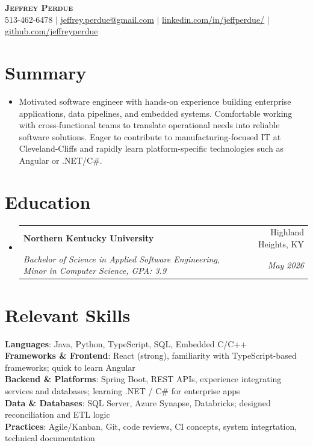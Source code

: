 \documentclass[letterpaper,11pt]{article}
\makeatletter
\newcommand{\resumeItem}[1]{
  \item\small{{#1 \vspace{-2pt}}}
}
\newcommand{\resumeSubheading}[4]{
  \vspace{-2pt}\item
    \begin{tabular*}{0.97\textwidth}[t]{l@{\extracolsep{\fill}}r}
      \textbf{#1} & #2 \\
      \textit{\small#3} & \textit{\small #4} \\
    \end{tabular*}\vspace{-7pt}
}
\newcommand{\resumeSubHeadingListStart}{\begin{itemize}[leftmargin=0.15in, label={}]}
\newcommand{\resumeSubHeadingListEnd}{\end{itemize}}
\newcommand{\resumeItemListStart}{\begin{itemize}}
\newcommand{\resumeItemListEnd}{\end{itemize}\vspace{-5pt}}
\makeatother
\begin{document}
\begin{center}
    \textbf{\Huge \scshape Jeffrey Perdue} \\ \vspace{1pt}
    \small 513-462-6478 $|$ \href{mailto:jeffrey.perdue@gmail.com}{\underline{jeffrey.perdue@gmail.com}} $|$
    \href{https://linkedin.com/in/jeffperdue/}{\underline{linkedin.com/in/jeffperdue/}} $|$
    \href{https://github.com/jeffreyperdue}{\underline{github.com/jeffreyperdue}}
\end{center}

\section{Summary}
\resumeSubHeadingListStart
\resumeItemListStart
\resumeItem{Motivated software engineer with hands-on experience building enterprise applications, data pipelines, and embedded systems. Comfortable working with cross-functional teams to translate operational needs into reliable software solutions. Eager to contribute to manufacturing-focused IT at Cleveland-Cliffs and rapidly learn platform-specific technologies such as Angular or .NET/C#.}
\resumeItemListEnd
\resumeSubHeadingListEnd

\section{Education}
\resumeSubHeadingListStart
\resumeSubheading
{Northern Kentucky University}{Highland Heights, KY}
{Bachelor of Science in Applied Software Engineering, Minor in Computer Science, GPA: 3.9}{May 2026}
\resumeSubHeadingListEnd

\section{Relevant Skills}
\begin{itemize}[leftmargin=0.15in, label={}]
\small{\item{
\textbf{Languages}: Java, Python, TypeScript, SQL, Embedded C/C++ \\
\textbf{Frameworks \& Frontend}: React (strong), familiarity with TypeScript-based frameworks; quick to learn Angular \\
\textbf{Backend \& Platforms}: Spring Boot, REST APIs, experience integrating services and databases; learning .NET / C# for enterprise apps \\
\textbf{Data \& Databases}: SQL Server, Azure Synapse, Databricks; designed reconciliation and ETL logic \\
\textbf{Practices}: Agile/Kanban, Git, code reviews, CI concepts, system integrtation, technical documentation
}}
\end{itemize}
\end{document}
